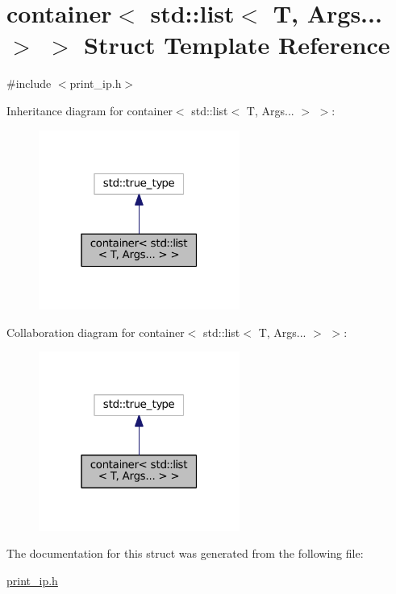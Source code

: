 \hypertarget{structcontainer_3_01std_1_1list_3_01T_00_01Args_8_8_8_01_4_01_4}{}\section{container$<$ std\+:\+:list$<$ T, Args... $>$ $>$ Struct Template Reference}
\label{structcontainer_3_01std_1_1list_3_01T_00_01Args_8_8_8_01_4_01_4}


{\ttfamily \#include $<$print\+\_\+ip.\+h$>$}



Inheritance diagram for container$<$ std\+:\+:list$<$ T, Args... $>$ $>$\+:
\nopagebreak
\begin{figure}[H]
\begin{center}
\leavevmode
\includegraphics[width=187pt]{structcontainer_3_01std_1_1list_3_01T_00_01Args_8_8_8_01_4_01_4__inherit__graph}
\end{center}
\end{figure}


Collaboration diagram for container$<$ std\+:\+:list$<$ T, Args... $>$ $>$\+:
\nopagebreak
\begin{figure}[H]
\begin{center}
\leavevmode
\includegraphics[width=187pt]{structcontainer_3_01std_1_1list_3_01T_00_01Args_8_8_8_01_4_01_4__coll__graph}
\end{center}
\end{figure}


The documentation for this struct was generated from the following file\+:\begin{DoxyCompactItemize}
\item 
\hyperlink{print__ip_8h}{print\+\_\+ip.\+h}\end{DoxyCompactItemize}
